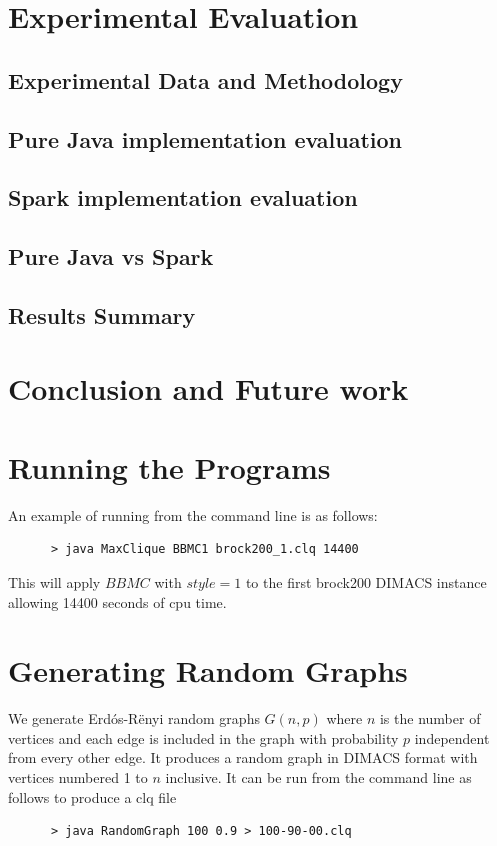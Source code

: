 \documentclass{l4proj}
\theoremstyle{definition}
\begin{document}
\chapter{Experimental Evaluation}
    \section{Experimental Data and Methodology}
    \section{Pure Java implementation evaluation}
    \section{Spark implementation evaluation}
    \section{Pure Java vs Spark}
    \section{Results Summary}
    
\chapter{Conclusion and Future work}

\begin{appendices}

\chapter{Running the Programs}
An example of running from the command line is as follows:
\begin{verbatim}
      > java MaxClique BBMC1 brock200_1.clq 14400
\end{verbatim}
This will apply $BBMC$ with $style = 1$ to the first brock200 DIMACS instance allowing 14400 seconds of cpu time.

\chapter{Generating Random Graphs}
\label{sec:randomGraph}
We generate Erd\'{o}s-R\"{e}nyi random graphs $G(n,p)$ where $n$ is the number of vertices and
each edge is included in the graph with probability $p$ independent from every other edge. It produces
a random graph in DIMACS format with vertices numbered 1 to $n$ inclusive. It can be run from the command line as follows to produce 
a clq file
\begin{verbatim}
      > java RandomGraph 100 0.9 > 100-90-00.clq
\end{verbatim}
\end{appendices}




\end{document}
